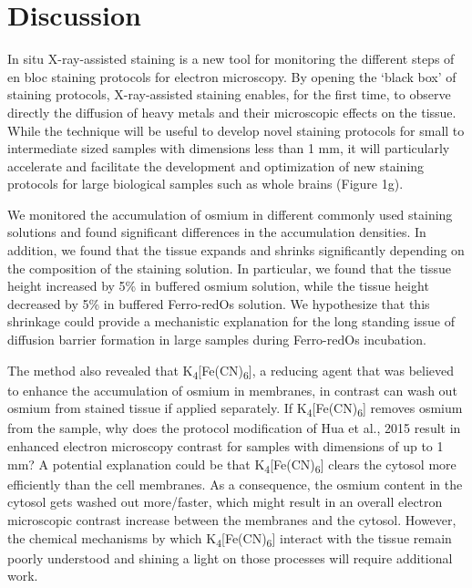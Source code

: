 \documentclass{article}
\begin{document}
\section*{Discussion}
In situ X-ray-assisted staining is a new tool for monitoring the different steps of en bloc staining protocols for electron microscopy. By opening the ‘black box’ of staining protocols, X-ray-assisted staining enables, for the first time, to observe directly the diffusion of heavy metals and their microscopic effects on the tissue. While the technique will be useful to develop novel staining protocols for small to intermediate sized samples with dimensions less than 1 mm, it will particularly accelerate and facilitate the development and optimization of new staining protocols for large biological samples such as whole brains (Figure 1g).

We monitored the accumulation of osmium in different commonly used staining solutions and found significant differences in the accumulation densities. In addition, we found that the tissue expands and shrinks significantly depending on the composition of the staining solution. In particular, we found that the tissue height increased by 5\% in buffered osmium solution, while the tissue height decreased by 5\% in buffered Ferro-redOs solution. We hypothesize that this shrinkage could provide a mechanistic explanation for the long standing issue of diffusion barrier formation in large samples during Ferro-redOs incubation.

The method also revealed that K\textsubscript{4}[Fe(CN)\textsubscript{6}], a reducing agent that was believed to enhance the accumulation of osmium in membranes, in contrast can wash out osmium from stained tissue if applied separately. If K\textsubscript{4}[Fe(CN)\textsubscript{6}] removes osmium from the sample, why does the protocol modification of Hua et al., 2015 result in enhanced electron microscopy contrast for samples with dimensions of up to 1 mm? A potential explanation could be that K\textsubscript{4}[Fe(CN)\textsubscript{6}] clears the cytosol more efficiently than the cell membranes. As a consequence, the osmium content in the cytosol gets washed out more/faster, which might result in an overall electron microscopic contrast increase between the membranes and the cytosol. However, the chemical mechanisms by which K\textsubscript{4}[Fe(CN)\textsubscript{6}] interact with the tissue remain poorly understood and shining a light on those processes will require additional work.
\end{document}
